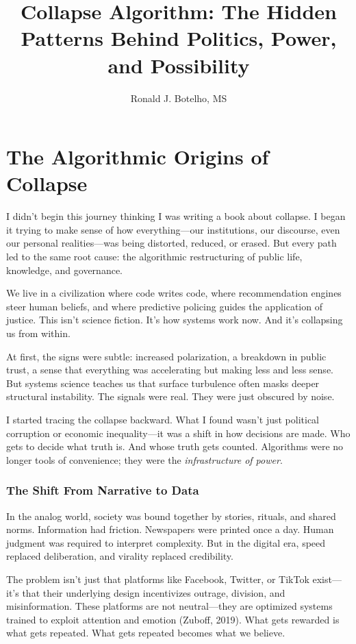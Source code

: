 \documentclass[12pt,twoside]{book}
\title{Collapse Algorithm: The Hidden Patterns Behind Politics, Power, and Possibility}
\author{Ronald J. Botelho, MS}
\date{}
\begin{document}
\chapter{The Algorithmic Origins of Collapse}


\begin{flushleft}
I didn’t begin this journey thinking I was writing a book about collapse. I began it trying to make sense of how everything—our institutions, our discourse, even our personal realities—was being distorted, reduced, or erased. But every path led to the same root cause: the algorithmic restructuring of public life, knowledge, and governance.

We live in a civilization where code writes code, where recommendation engines steer human beliefs, and where predictive policing guides the application of justice. This isn’t science fiction. It’s how systems work now. And it’s collapsing us from within.

At first, the signs were subtle: increased polarization, a breakdown in public trust, a sense that everything was accelerating but making less and less sense. But systems science teaches us that surface turbulence often masks deeper structural instability. The signals were real. They were just obscured by noise.

I started tracing the collapse backward. What I found wasn’t just political corruption or economic inequality—it was a shift in how decisions are made. Who gets to decide what truth is. And whose truth gets counted. Algorithms were no longer tools of convenience; they were the \textit{infrastructure of power}.
\end{flushleft}

\subsection*{The Shift From Narrative to Data}\label{the-shift-from-narrative-to-data}
In the analog world, society was bound together by stories, rituals, and shared norms. Information had friction. Newspapers were printed once a day. Human judgment was required to interpret complexity. But in the digital era, speed replaced deliberation, and virality replaced credibility.

The problem isn’t just that platforms like Facebook, Twitter, or TikTok exist—it’s that their underlying design incentivizes outrage, division, and misinformation. These platforms are not neutral—they are optimized systems trained to exploit attention and emotion (Zuboff, 2019). What gets rewarded is what gets repeated. What gets repeated becomes what we believe.
\end{document}
